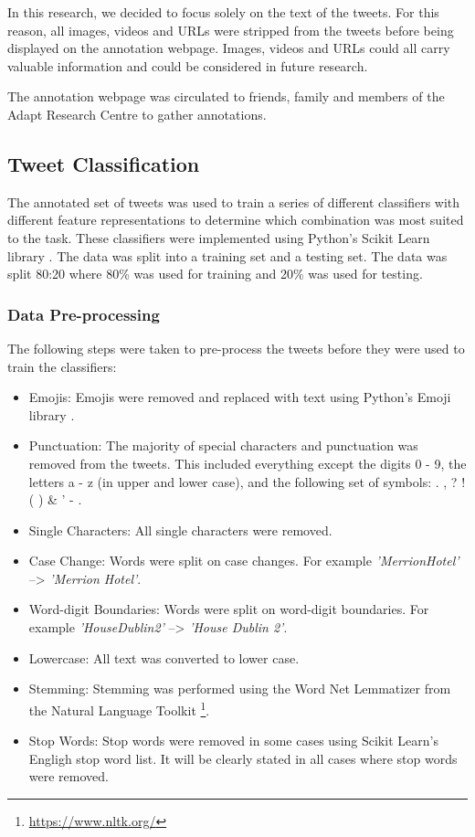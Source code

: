 In this research, we decided to focus solely on the text of the tweets. For this reason, all images, videos and URLs were stripped from the tweets before being displayed on the annotation webpage. Images, videos and URLs could all carry valuable information and could be considered in future research. 

The annotation webpage was circulated to friends, family and members of the Adapt Research Centre to gather annotations.

\subsection{Tweet Classification}
The annotated set of tweets was used to train a series of different classifiers with different feature representations to determine which combination was most suited to the task. These classifiers were implemented using Python's Scikit Learn library \cite{scikit-learn}. The data was split into a training set and a testing set. The data was split 80:20 where 80\% was used for training and 20\% was used for testing.

\subsubsection{Data Pre-processing}

The following steps were taken to pre-process the tweets before they were used to train the classifiers:
\begin{itemize}
    \item Emojis: Emojis were removed and replaced with text using Python's Emoji library \cite{emoji}.
    \item Punctuation: The majority of special characters and punctuation was removed from the tweets. This included everything except the digits 0 - 9, the letters a - z (in upper and lower case), and the following set of symbols: . , ? ! ( ) \& ' - . 
    \item Single Characters: All single characters were removed.
    \item Case Change: Words were split on case changes. For example \emph{'MerrionHotel'} --> \emph{'Merrion Hotel'}.
    \item Word-digit Boundaries: Words were split on word-digit boundaries. For example \emph{'HouseDublin2'} --> \emph{'House Dublin 2'}.
    \item Lowercase: All text was converted to lower case.
    \item Stemming: Stemming was performed using the Word Net Lemmatizer from the Natural Language Toolkit \footnote{\url{https://www.nltk.org/}}.
    \item Stop Words: Stop words were removed in some cases using Scikit Learn's Engligh stop word list. It will be clearly stated in all cases where stop words were removed.
\end{itemize}

